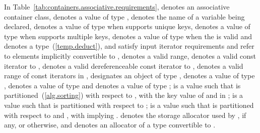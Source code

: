 \pnum
In Table~\ref{tab:containers.associative.requirements},
 denotes an associative container class,
 denotes a value of type ,
 denotes the name of a variable being declared,
 denotes a value of type 
when  supports unique keys,
 denotes a value of type 
when  supports multiple keys,
 denotes a value of type  when the 
 is valid
and denotes a type~(\ref{temp.deduct}),
 and 
satisfy input iterator requirements and refer to elements
implicitly convertible to
, 
denotes a valid range,
 denotes a valid const iterator to ,
 denotes a valid dereferenceable const iterator to ,
\tcode{[q1, q2)} denotes a valid range of const iterators in ,
 designates an object of type ,
 denotes a value of type ,
 denotes a value of type 
and  denotes a value of type ;
 is a value such that  is partitioned~(\ref{alg.sorting})
with respect to , with  the key value of 
and  in ;
 is a value such that  is partitioned with respect to
;
 is a value such that  is partitioned with respect to
 and , with  implying
.
 denotes the storage allocator used by , if any, or  otherwise, and  denotes an allocator of a type convertible to .


